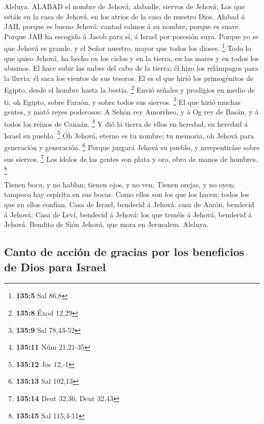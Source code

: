  Aleluya. ALABAD el nombre de Jehová; alabadle, siervos de
Jehová;  Los que estáis en la casa de Jehová, en los atrios
de la casa de nuestro Dios.  Alabad á JAH, porque es bueno
Jehová: cantad salmos á su nombre, porque es suave.  Porque
JAH ha escogido á Jacob para sí, á Israel por posesión suya.
 Porque yo se que Jehová es grande, y el Señor nuestro,
mayor que todos los dioses. \footnote{\textbf{135:5} Sal 86,8}
 Todo lo que quiso Jehová, ha hecho en los cielos y en la
tierra, en las mares y en todos los abismos.  El hace subir
las nubes del cabo de la tierra; él hizo los relámpagos para la lluvia;
él saca los vientos de sus tesoros.  El es el que hirió los
primogénitos de Egipto, desde el hombre hasta la bestia. \footnote{\textbf{135:8}
  Éxod 12,29}  Envió señales y prodigios en medio de ti, oh
Egipto, sobre Faraón, y sobre todos sus siervos. \footnote{\textbf{135:9}
  Sal 78,43-52}  El que hirió muchas gentes, y mató reyes
poderosos:  A Sehón rey Amorrheo, y á Og rey de Basán, y á
todos los reinos de Canaán. \footnote{\textbf{135:11} Núm 21,21-35}
 Y dió la tierra de ellos en heredad, en heredad á Israel
su pueblo. \footnote{\textbf{135:12} Jos 12,-1}  Oh Jehová,
eterno es tu nombre; tu memoria, oh Jehová para generación y generación.
\footnote{\textbf{135:13} Sal 102,13}  Porque juzgará
Jehová su pueblo, y arrepentiráse sobre sus siervos. \footnote{\textbf{135:14}
  Deut 32,36; Deut 32,43}  Los ídolos de las gentes son
plata y oro, obra de manos de hombres. \footnote{\textbf{135:15} Sal
  115,4-11}

 Tienen boca, y no hablan; tienen ojos, y no ven;
 Tienen orejas, y no oyen; tampoco hay espíritu en sus
bocas.  Como ellos son los que los hacen; todos los que en
ellos confían.  Casa de Israel, bendecid á Jehová: casa de
Aarón, bendecid á Jehová:  Casa de Leví, bendecid á Jehová:
los que teméis á Jehová, bendecid á Jehová.  Bendito de
Sión Jehová, que mora en Jerusalem. Aleluya.

\hypertarget{canto-de-acciuxf3n-de-gracias-por-los-beneficios-de-dios-para-israel}{%
\subsection{Canto de acción de gracias por los beneficios de Dios para
Israel}\label{canto-de-acciuxf3n-de-gracias-por-los-beneficios-de-dios-para-israel}}

